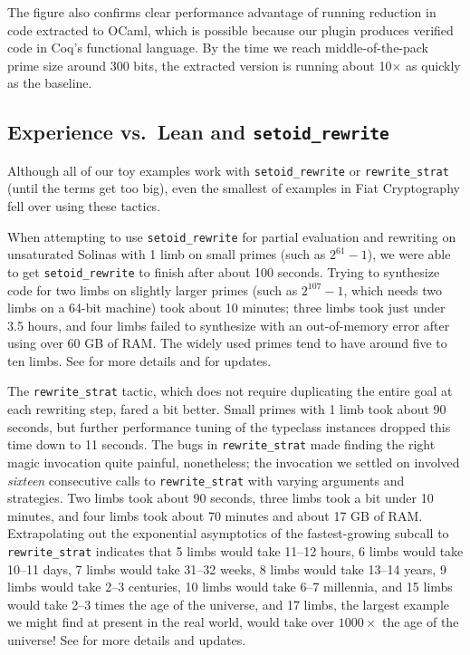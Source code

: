 The figure also confirms clear performance advantage of running reduction in code extracted to OCaml, which is possible because our plugin produces verified code in Coq's functional language.
By the time we reach middle-of-the-pack prime size around 300 bits, the extracted version is running about 10$\times$ as quickly as the baseline.


\subsection{Experience vs.\ Lean and \texorpdfstring{\texttt{setoid\_rewrite}}{setoid\_rewrite}\label{sec:lean}}

Although all of our toy examples work with \texttt{setoid\_rewrite} or \texttt{rewrite\_strat} (until the terms get too big), even the smallest of examples in Fiat Cryptography fell over using these tactics.

When attempting to use \texttt{setoid\_rewrite} for partial evaluation and rewriting on unsaturated Solinas with 1 limb on small primes (such as $2^{61}-1$), we were able to get \texttt{setoid\_rewrite} to finish after about 100 seconds.
Trying to synthesize code for two limbs on slightly larger primes (such as $2^{107}-1$, which needs two limbs on a 64-bit machine) took about 10 minutes;
three limbs took just under 3.5 hours, and four limbs failed to synthesize with an out-of-memory error after using over 60 GB of RAM.
The widely used primes tend to have around five to ten limbs.
See  for more details and for updates.

The \texttt{rewrite\_strat} tactic, which does not require duplicating the entire goal at each rewriting step, fared a bit better.
Small primes with 1 limb took about 90 seconds, but further performance tuning of the typeclass instances dropped this time down to 11 seconds.
The bugs in \texttt{rewrite\_strat} made finding the right magic invocation quite painful, nonetheless; the invocation we settled on involved \emph{sixteen} consecutive calls to \texttt{rewrite\_strat} with varying arguments and strategies.
Two limbs took about 90 seconds, three limbs took a bit under 10 minutes, and four limbs took about 70 minutes and about 17 GB of RAM.
Extrapolating out the exponential asymptotics of the fastest-growing subcall to \texttt{rewrite\_strat} indicates that 5 limbs would take 11--12 hours, 6 limbs would take 10--11 days, 7 limbs would take 31--32 weeks, 8 limbs would take 13--14 years, 9 limbs would take 2--3 centuries, 10 limbs would take 6--7 millennia, and 15 limbs would take 2--3 times the age of the universe, and 17 limbs, the largest example we might find at present in the real world, would take over $1000\times$ the age of the universe!
See  for more details and updates.


